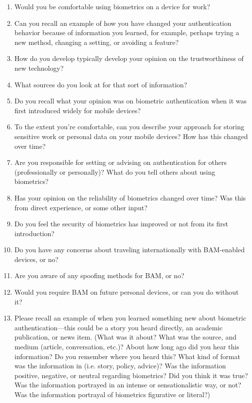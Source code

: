 \begin{enumerate}
\item Would you be comfortable using biometrics on a device for work?
\item Can you recall an example of how you have changed your authentication behavior because of information you learned, for example, perhaps trying a new method, changing a setting, or avoiding a feature?
\item How do you develop typically develop your opinion on the trustworthiness of new technology?
\item What sources do you look at for that sort of information?
\item Do you recall what your opinion was on biometric authentication when it was first introduced widely for mobile devices? 
\item To the extent you're comfortable, can you describe your approach for storing sensitive work or personal data on your mobile devices? How has this changed over time?
\item Are you responsible for setting or advising on authentication for others (professionally or personally)? What do you tell others about using biometrics?
\item Has your opinion on the reliability of biometrics changed over time? Was this from direct experience, or some other input?
\item Do you feel the security of biometrics has improved or not from its first introduction?
\item Do you have any concerns about traveling internationally with BAM-enabled devices, or no?
\item Are you aware of any spoofing methods for BAM, or no?
\item Would you require BAM on future personal devices, or can you do without it?
\item Please recall an example of when you learned something new about biometric authentication—this could be a story you heard directly, an academic publication, or news item. (What was it about? What was the source, and medium (article, conversation, etc.)? About how long ago did you hear this information? Do you remember where you heard this? What kind of format was the information in (i.e. story, policy, advice)? Was the information positive, negative, or neutral regarding biometrics? Did you think it was true? Was the information portrayed in an intense or sensationalistic way, or not? Was the information portrayal of biometrics figurative or literal?) 
\end{enumerate}
